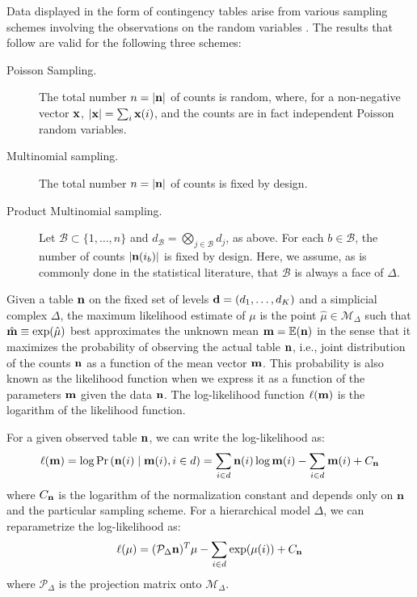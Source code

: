 \documentclass{elsart}
\begin{document}
Data displayed in the form of contingency tables arise from various 
sampling  schemes involving the observations on the random variables 
\citep[see][]{BFH75,HAB74}. The results that  follow are  valid for 
the following three schemes:
\begin{description}
\item[Poisson Sampling.]
The total number $n= |{\bf n}|$ of counts is
random, where, for a non-negative vector ${\bf x}$, $|{\bf x}| =
\sum_i {\bf x}(i)$, and the counts are in fact independent Poisson random variables.
\item[Multinomial sampling.] The total number  $n= |{\bf n}|$ of counts is fixed by design.
\item[Product Multinomial sampling.]
Let $\mathcal{B} \subset \{1,\ldots,n \}$ and $d_{\mathcal{B}} =
\bigotimes_{j \in \mathcal{B}} d_j$, as above. For each $b \in
\mathcal{B}$, the number of counts $|{\bf n}(i_b)|$ is fixed by
design. Here, we assume, as is commonly done in the statistical literature,
 that $\mathcal{B}$ is always a face of
$\Delta$.
\end{description}

Given a table ${\bf n}$  on the fixed set of
levels ${\bf d} = (d_1,\ldots,d_K)$ and a simplicial complex $\Delta$,
the maximum likelihood estimate of $\mu$ is the point
$\hat{\mu} \in \mathcal{M}_\Delta$ such that $\hat{{\bf m}} \equiv
\exp(\hat{\mu})$ best approximates the unknown mean ${\bf m} =
\mathbb{E} ({\bf n})$ in the sense that it maximizes the probability
of observing the actual table ${\bf n}$, i.e., joint distribution of the counts
${\bf n}$ as a function of the mean  vector ${\bf m}$. This probability is also
 known as the likelihood function when we express it as a function of the
  parameters ${\bf m}$ given the data  ${\bf n}$.  The log-likelihood function 
  $\ell({\bf m})$ is the logarithm of the likelihood function.

For a given observed table ${\bf n}$, we can write  the log-likelihood as:
\[
\ell({\bf m}) = \log\mathrm{Pr} \left( {\bf n}(i) \mid{\bf m}(i), i \in d \right) 
= \sum_{i \in d} {\bf n}(i) \log{\bf m}(i) - \sum_{i \in d} {\bf m}(i) + C_{\bf n}
\]
where $C_{\bf n}$ is the logarithm of the normalization constant and
depends only on $\mathbf{n}$ and the particular sampling scheme. 
For a hierarchical model $\Delta$, we can reparametrize the log-likelihood as: 
\[
\ell(\mu) = (\mathcal{P}_{\Delta} {\bf n})^{T} \mu - \sum_{i \in d}
\exp(\mu(i)) + C_{\bf n} 
\]
where $\mathcal{P}_{\Delta}$ is the projection matrix onto $\mathcal{M}_{\Delta}$.
\end{document}
